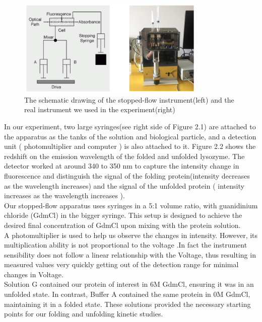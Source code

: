 \documentclass[a4paper,english,12pt,bibliography=totoc]{scrreprt}
\begin{document}
\begin{figure}[H]
    \centering
    \includegraphics[width = 0.8\textwidth]{Images/stopped-flow instrument.png}
    \caption{The schematic drawing of the stopped-flow instrument(left) and the real instrument we used in the experiment(right)}
    \label{fig:enter-label}
\end{figure}
In our experiment, two large syringes(see right side of Figure 2.1) are attached to the apparatus as the tanks of the solution and biological particle, and a detection unit ( photomultiplier and computer ) is also attached to it. Figure 2.2 shows the redshift on the emission wavelength of the folded and unfolded lysozyme. The detector worked at around 340 to 350 nm to capture the intensity change in fluorescence and distinguish the signal of the folding protein(intensity decreases as the wavelength increases) and the signal of the unfolded protein ( intensity increases as the wavelength increases ).\\

Our stopped-flow apparatus uses syringes in a 5:1 volume ratio, with guanidinium chloride (GdmCl) in the bigger syringe. This setup is designed to achieve the desired final concentration of GdmCl upon mixing with the protein solution.\\

A photomultiplier is used to help us observe the changes in intensity. However, its multiplication ability is not proportional to the voltage .In fact the instrument sensibility does not follow a linear relationship with the Voltage, thus resulting in measured values very quickly getting out of the detection range for minimal changes in Voltage.\\

Solution G contained our protein of interest in 6M GdmCl, ensuring it was in an unfolded state. In contrast, Buffer A contained the same protein in 0M GdmCl, maintaining it in a folded state. These solutions provided the necessary starting points for our folding and unfolding kinetic studies.\\
\end{document}
